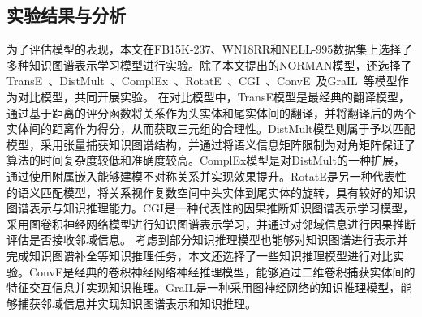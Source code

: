 \documentclass[algorithmlist, AutoFakeBold, AutoFakeSlant, figurelist, tablelist, nomlist, masters]{seuthesix}
\begin{document}
\subsection{实验结果与分析}
为了评估模型的表现，本文在FB15K-237、WN18RR和NELL-995数据集上选择了多种知识图谱表示学习模型进行实验。除了本文提出的NORMAN模型，还选择了TransE~\cite{bordes2013translating}、DistMult~\cite{yang2015embedding}、ComplEx~\cite{trouillon2016complex}、RotatE~\cite{sun2018rotate}、CGI~\cite{feng2021should}、ConvE~\cite{dettmers2018convolutional}及GraIL~\cite{teru2020inductive}等模型作为对比模型，共同开展实验。
在对比模型中，TransE模型是最经典的翻译模型，通过基于距离的评分函数将关系作为头实体和尾实体间的翻译，并将翻译后的两个实体间的距离作为得分，从而获取三元组的合理性。DistMult模型则属于予以匹配模型，采用张量捕获知识图谱结构，并通过将语义信息矩阵限制为对角矩阵保证了算法的时间复杂度较低和准确度较高。ComplEx模型是对DistMult的一种扩展，通过使用附属嵌入能够建模不对称关系并实现效果提升。RotatE是另一种代表性的语义匹配模型，将关系视作复数空间中头实体到尾实体的旋转，具有较好的知识图谱表示与知识推理能力。CGI是一种代表性的因果推断知识图谱表示学习模型，采用图卷积神经网络模型进行知识图谱表示学习，并通过对邻域信息进行因果推断评估是否接收邻域信息。
考虑到部分知识推理模型也能够对知识图谱进行表示并完成知识图谱补全等知识推理任务，本文还选择了一些知识推理模型进行对比实验。ConvE是经典的卷积神经网络神经推理模型，能够通过二维卷积捕获实体间的特征交互信息并实现知识推理。GraIL是一种采用图神经网络的知识推理模型，能够捕获邻域信息并实现知识图谱表示和知识推理。
\end{document}
